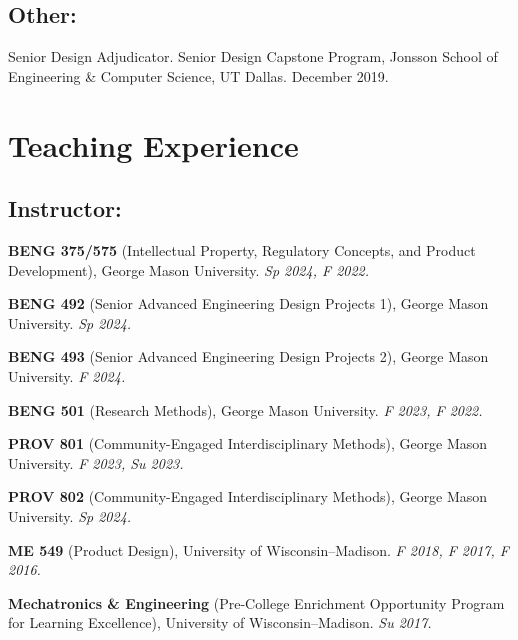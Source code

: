 \documentclass[letterpaper, 10pt]{article}
\begin{document}
\subsection{Other:}
\begin{compactenum}
    \item Senior Design Adjudicator. Senior Design Capstone Program, Jonsson School of Engineering \& Computer Science, UT Dallas. December 2019.
\end{compactenum}

\section{Teaching Experience}

\subsection{Instructor:}

\begin{compactitem}
     \item \textbf{BENG 375/575} (Intellectual Property, Regulatory Concepts, and Product Development), George Mason University. \textit{Sp 2024, F 2022.}
     \item \textbf{BENG 492} (Senior Advanced Engineering Design Projects 1), George Mason University. \textit{Sp 2024.}
     \item \textbf{BENG 493} (Senior Advanced Engineering Design Projects 2), George Mason University. \textit{F 2024.}
     \item \textbf{BENG 501} (Research Methods), George Mason University. \textit{F 2023, F 2022.}
     \item \textbf{PROV 801} (Community-Engaged Interdisciplinary Methods), George Mason University. \textit{F 2023, Su 2023.}
     \item \textbf{PROV 802} (Community-Engaged Interdisciplinary Methods), George Mason University. \textit{Sp 2024.}
     \item \textbf{ME 549} (Product Design), University of Wisconsin--Madison. \textit{F 2018, F 2017, F 2016.}
     \item \textbf{Mechatronics \& Engineering} (Pre-College Enrichment Opportunity Program for Learning Excellence), University of Wisconsin--Madison. \textit{Su 2017.}
\end{compactitem}
\end{document}
